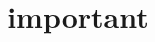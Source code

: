 \documentclass[11pt, letterpaper]{article}
\title{important}
\begin{document}
\makereport
\end{document}
